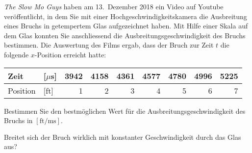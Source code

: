 {\em The Slow Mo Guys} haben am 13.~Dezember 2018 ein Video auf Youtube
veröffentlicht, in dem Sie mit einer Hochgeschwindigkeitskamera die
Ausbreitung eines Bruchs in getempertem Glas aufgezeichnet haben.
Mit Hilfe einer Skala auf dem Glas konnten Sie anschliessend die 
Ausbreitungsgeschwindigkeit des Bruchs bestimmen.
Die Auswertung des Films ergab, dass der Bruch zur Zeit $t$ die folgende
$x$-Position erreicht hatte:
\begin{center}
\begin{tabular}{ll|rrrrrrr}
Zeit    &[$\mu$s]&3942&4158&4361&4577&4780&4996&5225\\
\hline
Position&[ft]    &1      &2      &3      &4     &5     &6     &7
\end{tabular}
\end{center}
\begin{teilaufgaben}
\item
Bestimmen Sie den bestmöglichen Wert für die Ausbreitungsgeschwindigkeit
des Bruchs in $[\text{ft}/\text{ms}]$.
\item
Breitet sich der Bruch wirklich mit konstanter Geschwindigkeit durch das
Glas aus?
\end{teilaufgaben}

